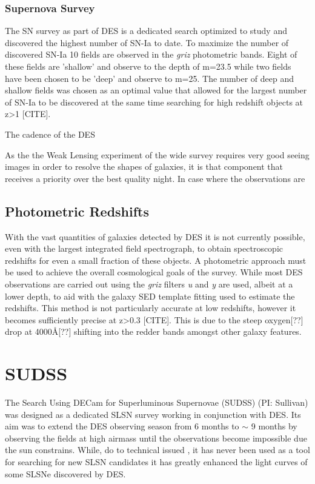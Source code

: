 \subsubsection{Supernova Survey}
The SN survey as part of DES is a dedicated search optimized to study and discovered the highest number of SN-Ia to date. To maximize the number of discovered SN-Ia 10 fields are observed in the \textit{griz} photometric bands. Eight of these fields are 'shallow' and observe to the depth of m=23.5 while two fields have been chosen to be 'deep' and observe to m=25. The number of deep and shallow fields was chosen as an optimal value that allowed for the largest number of SN-Ia to be discovered at the same time searching for high redshift objects at z>1 [CITE].

The cadence of the DES

As the the Weak Lensing experiment of the wide survey requires very good seeing images in order to resolve the shapes of galaxies, it is that component that receives a priority over the best quality night. In case where the observations are

\subsection{Photometric Redshifts}
With the vast quantities of galaxies detected by DES it is not currently possible, even with the largest integrated field spectrograph, to obtain spectroscopic redshifts for even a small fraction of these objects. A photometric approach must be used to achieve the overall cosmological goals of the survey. While most DES observations are carried out using the \textit{griz} filters \textit{u} and \textit{y} are used, albeit at a lower depth, to aid with the galaxy SED template fitting used to estimate the redshifts. This method is not particularly accurate at low redshifts, however it becomes sufficiently precise at z>0.3 [CITE]. This is due to the steep oxygen[??] drop at 4000\AA [??] shifting into the redder bands amongst other galaxy features.


\section{SUDSS}
The Search Using DECam for Superluminous Supernovae (SUDSS) (PI: Sullivan) was designed as a dedicated SLSN survey working in conjunction with DES. Its aim was to extend the DES observing season from 6 months to $\sim$ 9 months by observing the fields at high airmass until the observations become impossible due the sun constrains. While, do to technical issued , it has never been used as a tool for searching for new SLSN candidates it has greatly enhanced the light curves of some SLSNe discovered by DES.

